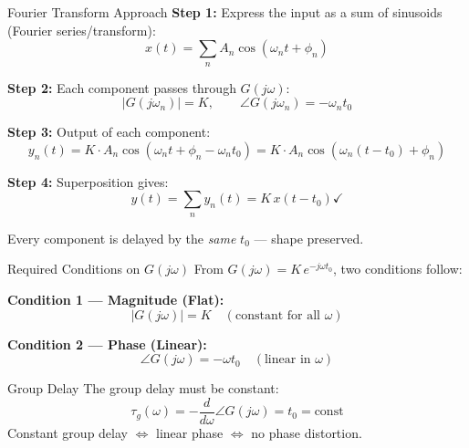 \documentclass{beamer}
\begin{document}
\begin{frame}{Fourier Transform Approach}
\textbf{Step 1:} Express the input as a sum of sinusoids (Fourier series/transform):
\[
  x(t) = \sum_{n} A_n \cos(\omega_n t + \phi_n)
\]

\textbf{Step 2:} Each component passes through $G(j\omega)$:
\[
  |G(j\omega_n)| = K, \qquad \angle G(j\omega_n) = -\omega_n t_0
\]

\textbf{Step 3:} Output of each component:
\[
  y_n(t) = K \cdot A_n \cos\!\left(\omega_n t + \phi_n - \omega_n t_0\right)
         = K \cdot A_n \cos\!\left(\omega_n(t - t_0) + \phi_n\right)
\]

\textbf{Step 4:} Superposition gives:
\[
  y(t) = \sum_n y_n(t) = K\,x(t - t_0) \checkmark
\]

Every component is delayed by the \emph{same} $t_0$ — shape preserved.
\end{frame}

\begin{frame}{Required Conditions on $G(j\omega)$}
From $G(j\omega) = K\,e^{-j\omega t_0}$, two conditions follow:

\vspace{0.4em}
\textbf{Condition 1 — Magnitude (Flat):}
\[
  \bigl|G(j\omega)\bigr| = K \quad (\text{constant for all }\omega)
\]

\vspace{0.4em}
\textbf{Condition 2 — Phase (Linear):}
\[
  \angle G(j\omega) = -\omega t_0 \quad (\text{linear in }\omega)
\]

\vspace{0.5em}
\begin{block}{Group Delay}
The group delay must be constant:
\[
  \tau_g(\omega) = -\frac{d}{d\omega}\angle G(j\omega) = t_0 = \text{const}
\]
Constant group delay $\Leftrightarrow$ linear phase $\Leftrightarrow$ no phase distortion.
\end{block}
\end{frame}
\end{document}
